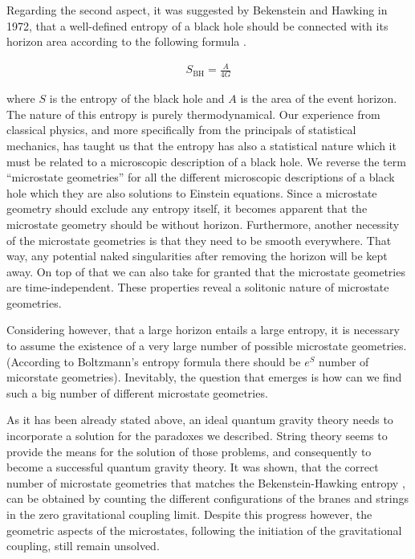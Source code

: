 \documentclass[a4paper,notitlepage]{report}
\begin{document}
Regarding the second aspect, it was suggested by Bekenstein and Hawking in 1972, that a well-defined entropy of a black hole should be connected with its horizon area according to the following formula \cite{bekenstein1973black,hawking1974nature}.

\begin{align}
S_{\text{BH}} = \frac{A}{4G}
\end{align}

\vspace{0.5 em}
where $S$ is the entropy of the black hole and $A$ is the area of the event horizon. The nature of this entropy is purely thermodynamical. Our experience from classical physics, and more specifically from the principals of statistical mechanics, has taught us that the entropy has also a statistical nature which it must be related to a microscopic description of a black hole. We reverse the term ``microstate geometries'' for all the different microscopic descriptions of a black hole which they are also solutions to Einstein equations. Since a microstate geometry should exclude any entropy itself, it becomes apparent that the microstate geometry should be without horizon. Furthermore, another necessity of the microstate geometries is that they need to be smooth everywhere. That way, any potential naked singularities after removing the horizon will be kept away. On top of that we can also take for granted that the microstate geometries are time-independent. These properties reveal a solitonic nature of microstate geometries. 

Considering however, that a large horizon entails a large entropy, it is necessary to assume the existence of a very large number of possible microstate geometries. (According to Boltzmann's entropy formula there should be $e^S$ number of micorstate geometries). Inevitably, the question that emerges is how can we find such a big number of different microstate geometries. 

As it has been already stated above, an ideal quantum gravity theory needs to incorporate a solution for the paradoxes we described. String theory seems to provide the means for the solution of those problems, and consequently to become a successful quantum gravity theory. It was shown, that the correct number of microstate geometries that matches the Bekenstein-Hawking entropy \cite{bekenstein1973black,hawking1974nature}, can be obtained by counting the different configurations of the branes and strings in the zero gravitational coupling limit. Despite this progress however, the geometric aspects of the microstates, following the initiation of the gravitational coupling, still remain unsolved. 
\end{document}
